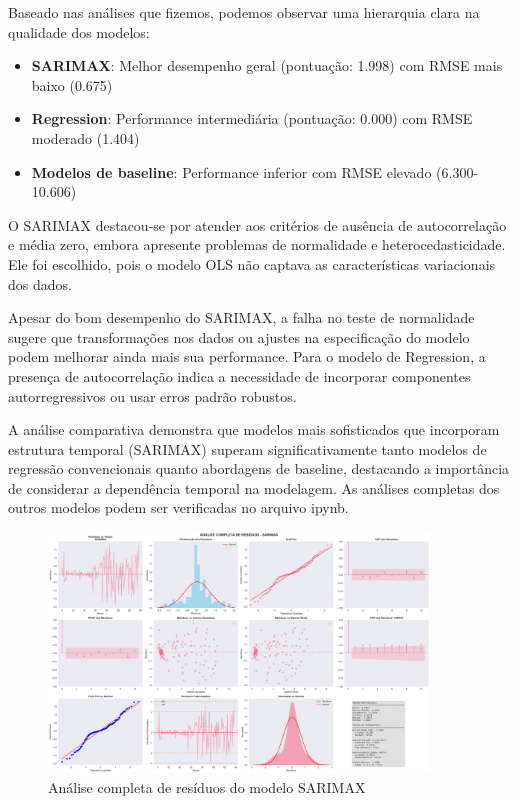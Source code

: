 \documentclass{article}
\begin{document}
Baseado nas análises que fizemos, podemos observar uma hierarquia clara na qualidade dos modelos:

\begin{itemize}
    \item \textbf{SARIMAX}: Melhor desempenho geral (pontuação: 1.998) com RMSE mais baixo (0.675)
    \item \textbf{Regression}: Performance intermediária (pontuação: 0.000) com RMSE moderado (1.404)
    \item \textbf{Modelos de baseline}: Performance inferior com RMSE elevado (6.300-10.606)
\end{itemize}

O SARIMAX destacou-se por atender aos critérios de ausência de autocorrelação e média zero, embora apresente problemas de normalidade e heterocedasticidade. Ele foi escolhido, pois o modelo OLS não captava as características variacionais dos dados.

Apesar do bom desempenho do SARIMAX, a falha no teste de normalidade sugere que transformações nos dados ou ajustes na especificação do modelo podem melhorar ainda mais sua performance. Para o modelo de Regression, a presença de autocorrelação indica a necessidade de incorporar componentes autorregressivos ou usar erros padrão robustos.

A análise comparativa demonstra que modelos mais sofisticados que incorporam estrutura temporal (SARIMAX) superam significativamente tanto modelos de regressão convencionais quanto abordagens de baseline, destacando a importância de considerar a dependência temporal na modelagem. As análises completas dos outros modelos podem ser verificadas no arquivo ipynb.

\begin{figure}[H]
    \centering
    \includegraphics[width=0.9\textwidth]{images/sarimax_analisado.png}
    \caption{Análise completa de resíduos do modelo SARIMAX}
    \label{fig:sarimax_residuals}
\end{figure}
\end{document}
